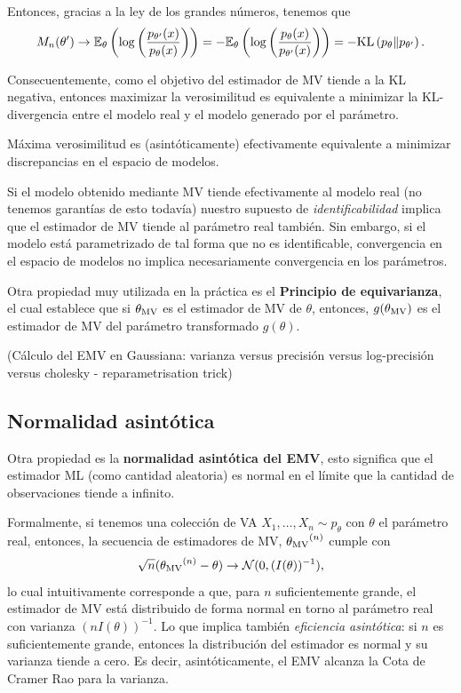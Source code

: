  Entonces, gracias a la ley de los grandes números, tenemos que 
 \begin{equation}
 	M_n(\theta') \rightarrow \mathbb{E}_\theta \left(\log\left(\frac{p_{\theta'}(x)}{p_{\theta}(x)}\right)\right) = -\mathbb{E}_\theta \left(\log\left(\frac{p_{\theta}(x)}{p_{\theta'}(x)}\right)\right) = -\text{KL}\left(p_\theta\middle\|p_{\theta'}\right).
 \end{equation}

 Consecuentemente, como el objetivo del estimador de MV tiende a la KL negativa, entonces maximizar la verosimilitud es equivalente a minimizar la KL-divergencia entre el modelo real y el modelo generado por el parámetro. 
\begin{remark}
 Máxima verosimilitud es (asintóticamente) efectivamente equivalente a minimizar discrepancias en el espacio de modelos.
\end{remark}
 
\begin{remark}
 Si el modelo obtenido mediante MV tiende efectivamente al modelo real (no tenemos garantías de esto todavía) nuestro supuesto de \textit{identificabilidad} implica que el estimador de MV tiende al parámetro real también. Sin embargo, si el modelo está parametrizado de tal forma que no es identificable, convergencia en el espacio de modelos no implica necesariamente convergencia en los parámetros.   
\end{remark}
 
 


 Otra propiedad muy utilizada en la práctica es el \textbf{Principio de equivarianza}, el cual establece que si ${\theta_\text{MV}}$ es el estimador de MV de $\theta$, entonces, $g({\theta_\text{MV}})$ es el estimador de MV del parámetro transformado $g(\theta)$.

\begin{example}(Cálculo del EMV en Gaussiana: varianza versus precisión versus log-precisión versus cholesky - reparametrisation trick)
	
\end{example}

\subsection{Normalidad asintótica}

Otra propiedad es la \textbf{normalidad asintótica del EMV}, esto significa que el estimador ML (como cantidad aleatoria) es normal en el límite que la cantidad de  observaciones tiende a infinito. 

Formalmente, si tenemos una colección de VA $X_1,\ldots,X_n\sim p_\theta$ con $\theta$ el parámetro real, entonces, la secuencia de estimadores de MV, ${\theta_\text{MV}}^{(n)}$ cumple con 
\begin{equation}
	\sqrt{n}({\theta_\text{MV}}^{(n)}-\theta)\rightarrow {\mathcal N}(0,(I(\theta))^{-1}),
\end{equation}
lo cual intuitivamente corresponde a que, para $n$ suficientemente grande, el estimador de MV está distribuido de forma normal en torno al parámetro real con varianza $(nI(\theta))^{-1}$. Lo que implica también \textit{eficiencia asintótica}: si $n$ es suficientemente grande, entonces la distribución del estimador es normal y su varianza tiende a cero. Es decir, asintóticamente, el EMV alcanza la Cota de Cramer Rao para la varianza. 


